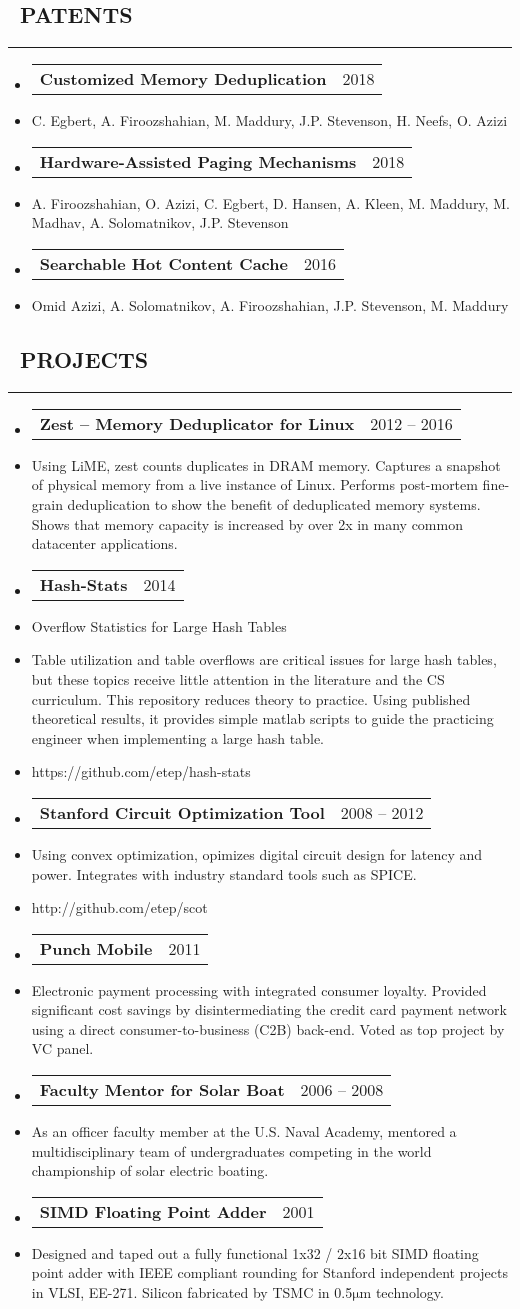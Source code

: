 \documentclass[10pt,letterpaper]{article}
\makeatletter
\newenvironment{resumesection}[1]
{%
    \subsection*{\ \textcolor{light-gray}{#1} }
    \vspace{-0.4em}
    \begin{samepage}
    \hrule
    \end{samepage}
    \vspace{+0.4em}
    \begin{itemize}[leftmargin=0.15cm]
        \parskip=0.1em
}%
{%
    \end{itemize}
}%
\newcommand{\myitem}[1] {
    \item[] \textcolor{dark-gray}{#1}
}
\newcommand{\headerbi}[2] {
    \item[] \begin{tabular*}{\linewidth}{l@{\extracolsep{\fill}}r}
    \textbf{#1} & #2 \\
    \end{tabular*}
}
\newcommand{\rminiw}{0.550}
\makeatother
\begin{document}
\begin{minipage}[t]{\rminiw\textwidth}
    \begin{resumesection}{PATENTS}
        \headerbi{Customized Memory Deduplication}{2018}
        \myitem{C. Egbert, A. Firoozshahian, M. Maddury, J.P. Stevenson, H. Neefs, O. Azizi}
        \headerbi{Hardware-Assisted Paging Mechanisms}{2018}
        \myitem{A. Firoozshahian, O. Azizi, C. Egbert, D. Hansen, A. Kleen, M. Maddury, M. Madhav, A. Solomatnikov, J.P. Stevenson}
        \headerbi{Searchable Hot Content Cache}{2016}
        \myitem{Omid Azizi, A. Solomatnikov, A. Firoozshahian, J.P. Stevenson, M. Maddury}
    \end{resumesection}
\begin{resumesection}{PROJECTS}
    \headerbi{Zest -- Memory Deduplicator for Linux}{2012 -- 2016}
    \myitem{
        Using LiME, zest counts duplicates in DRAM memory.
        Captures a snapshot of physical memory from a live instance of Linux.
        Performs post-mortem fine-grain deduplication to show the benefit of deduplicated memory systems.
        Shows that memory capacity is increased by over 2x in many common datacenter applications.
    }
    \headerbi{Hash-Stats}{2014}
    \myitem{Overflow Statistics for Large Hash Tables}
    \myitem{
        Table utilization and table overflows are critical issues for large hash tables,
        but these topics receive little attention in the literature and the CS curriculum.
        This repository reduces theory to practice.
        Using published theoretical results, it provides simple matlab scripts to guide the practicing engineer when implementing a large hash table.
    }
    \myitem{https://github.com/etep/hash-stats}
    \headerbi{Stanford Circuit Optimization Tool}{2008 -- 2012}
    \myitem{
        Using convex optimization, opimizes digital circuit design for latency and power.
        Integrates with industry standard tools such as SPICE.
    }
    \myitem{http://github.com/etep/scot}
    \headerbi{Punch Mobile}{2011}
    \myitem{
        Electronic payment processing with integrated consumer loyalty.
        Provided significant cost savings by disintermediating the credit card payment network using a direct consumer-to-business (C2B) back-end.
        Voted as top project by VC panel.
    }
    \headerbi{Faculty Mentor for Solar Boat}{2006 -- 2008}
    \myitem{
        As an officer faculty member at the U.S. Naval Academy,
        mentored a multidisciplinary team of undergraduates
        competing in the world championship of solar electric boating.
    }
    \headerbi{SIMD Floating Point Adder}{2001}
    \myitem{
        Designed and taped out a fully functional 1x32 / 2x16 bit
        SIMD floating point adder with IEEE compliant rounding
        for Stanford independent projects in VLSI, EE-271.
        Silicon fabricated by TSMC in 0.5$\mathrm{ \mu m}$ technology.
    }
\end{resumesection}
\end{minipage}
\end{document}
